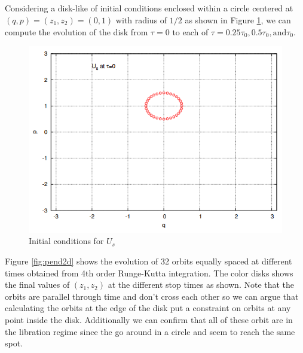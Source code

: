\subsection{}
Considering a disk-like of initial conditions enclosed within a circle centered at $(q,p)=(z_1,z_2)=(0,1)$ with radius of $1/2$ as shown in Figure \ref{fig:MartinsUs}, we can compute the evolution of the disk from $\tau=0$ to each of $\tau=0.25\tau_0,0.5\tau_0,\mathrm{and}\tau_0$.
\begin{figure}[h]
    \centering
    \includegraphics[width=\columnwidth]{CodeAndFigures/Fig1InitialConditionsUs.png}
    \caption{Initial conditions for $U_s$}
    \label{fig:MartinsUs}
\end{figure}

Figure \ref{fig:pend2d} shows the evolution of 32 orbits equally spaced at different times obtained from 4th order Runge-Kutta integration. The color disks shows the final values of $(z_1,z_2)$ at the different stop times as shown. Note that the orbits are parallel through time and don't cross each other so we can argue that calculating the orbits at the edge of the disk put a constraint on orbits at any point inside the disk. Additionally we can confirm that all of these orbit are in the libration regime since the go around in a circle and seem to reach the same spot.

